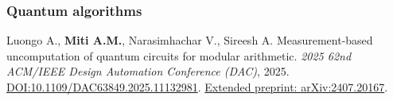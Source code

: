 \documentclass[a4paper,fontsize=11bp]{scrartcl}
\newenvironment{refsection}{\begingroup}{\endgroup}
\begin{document}
\begin{refsection}
\begin{ERCoutputlist}
\end{ERCoutputlist}

\subsubsection*{Quantum algorithms}

%
\begin{ERCoutputlist}
\setcounter{ERCselectedoutput}{9}
\item Luongo A., \textbf{Miti A.M.}, Narasimhachar V., Sireesh A.
Measurement-based uncomputation of quantum circuits for modular arithmetic.
\emph{2025 62nd ACM/IEEE Design Automation Conference (DAC)}, 2025.
\href{https://doi.org/10.1109/DAC63849.2025.11132981}{DOI:10.1109/DAC63849.2025.11132981}.
\href{https://arxiv.org/abs/2407.20167}{Extended preprint: arXiv:2407.20167}.

\end{ERCoutputlist}

\endgroup

\end{refsection}
\par\clearpage
\endgroup %
\end{document}
